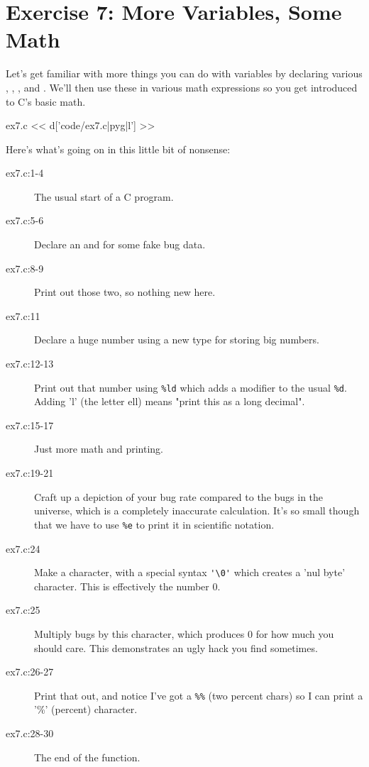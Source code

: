 \chapter{Exercise 7: More Variables, Some Math}

Let's get familiar with more things you can do with variables by 
declaring various , , , and 
.  We'll then use these in various math expressions
so you get introduced to C's basic math.

\begin{code}{ex7.c}
<< d['code/ex7.c|pyg|l'] >>
\end{code}

Here's what's going on in this little bit of nonsense:

\begin{description}
\item[ex7.c:1-4] The usual start of a C program.
\item[ex7.c:5-6] Declare an  and  for some fake bug data.
\item[ex7.c:8-9] Print out those two, so nothing new here.
\item[ex7.c:11] Declare a huge number using a new type  for storing
    big numbers.
\item[ex7.c:12-13] Print out that number using \verb|%ld| which adds a modifier
    to the usual \verb|%d|. Adding 'l' (the letter ell) means "print this
    as a long decimal".
\item[ex7.c:15-17] Just more math and printing.
\item[ex7.c:19-21] Craft up a depiction of your bug rate compared to the bugs in
    the universe, which is a completely inaccurate calculation.  It's so small
    though that we have to use \verb|%e| to print it in scientific notation.
\item[ex7.c:24] Make a character, with a special syntax \verb|'\0'| which creates
    a 'nul byte' character.  This is effectively the number 0.
\item[ex7.c:25] Multiply bugs by this character, which produces 0 for how much you
    should care.  This demonstrates an ugly hack you find sometimes.
\item[ex7.c:26-27] Print that out, and notice I've got a \verb|%%| (two percent
        chars) so I can print a '\%' (percent) character.
\item[ex7.c:28-30] The end of the  function.
\end{description}

